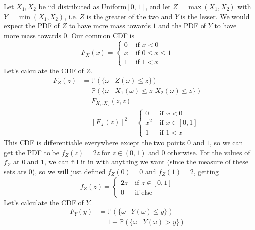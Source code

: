 \documentclass{article}
\begin{document}
      \begin{example}[Uniforms]
        Let $X_1, X_2$ be iid distributed as $\mathrm{Uniform}[0, 1]$, and let $Z = \max(X_1, X_2)$ with $Y = \min(X_1, X_2)$, i.e. $Z$ is the greater of the two and $Y$ is the lesser. We would expect the PDF of $Z$ to have more mass towards $1$ and the PDF of $Y$ to have more mass towards $0$. Our common CDF is 
        \begin{equation}
          F_{X} (x) = \begin{cases} 0 & \text{ if } x < 0 \\
          x & \text{ if } 0 \leq x \leq 1 \\
          1 & \text{ if } 1 < x \end{cases}
        \end{equation}
        Let's calculate the CDF of $Z$. 
        \begin{align*}
          F_{Z} (z) & = \mathbb{P}(\{\omega \mid Z(\omega) \leq z\}) \\
          & = \mathbb{P}(\{ \omega \mid X_1 (\omega) \leq z, X_2 (\omega) \leq z\}) \\
          & = F_{X_1, X_2} (z, z) \\
          & = [F_{X} (z)]^2 = \begin{cases} 0 & \text{ if } x < 0 \\
          x^2 & \text{ if } x \in [0, 1] \\
          1 & \text{ if } 1 < x \end{cases}
        \end{align*}
        This CDF is differentiable everywhere except the two points $0$ and $1$, so we can get the PDF to be $f_Z (z) = 2 z$ for $z \in (0, 1)$ and $0$ otherwise. For the values of $f_Z$ at $0$ and $1$, we can fill it in with anything we want (since the measure of these sets are $0$), so we will just defined $f_Z (0) = 0$ and $f_Z(1) = 2$, getting 
        \begin{equation}
          f_Z (z) = \begin{cases} 2 z & \text{ if } z \in [0, 1] \\
          0 & \text{ if else} \end{cases}
        \end{equation}
        Let's calculate the CDF of $Y$. 
        \begin{align*}
          F_{Y} (y) & = \mathbb{P}(\{ \omega \mid Y(\omega) \leq y\}) \\
          & = 1 - \mathbb{P}(\{ \omega \mid Y(\omega) > y\}) \\

\end{align*}
\end{example}
\end{document}
